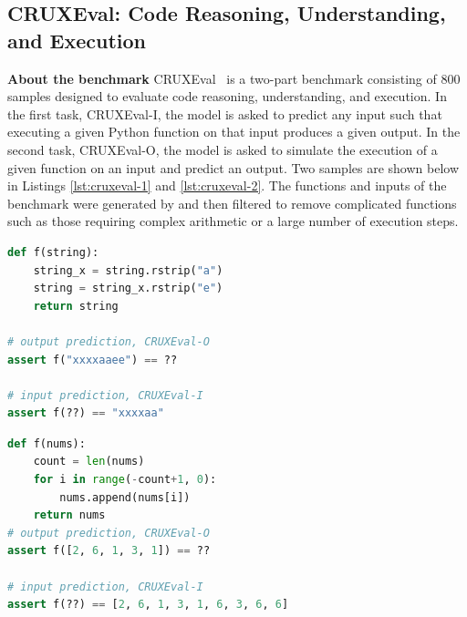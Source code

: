 \documentclass[10pt]{article} %
\begin{document}
\subsection{CRUXEval: Code Reasoning, Understanding, and Execution}
\label{crux-eval}
\textbf{About the benchmark} CRUXEval~\citep{gu2024cruxeval} is a two-part benchmark consisting of $800$ samples designed to evaluate code reasoning, understanding, and execution. In the first task, CRUXEval-I, the model is asked to predict any input such that executing a given Python function on that input produces a given output. In the second task, CRUXEval-O, the model is asked to simulate the execution of a given function on an input and predict an output. Two samples are shown below in Listings \ref{lst:cruxeval-1} and \ref{lst:cruxeval-2}. The functions and inputs of the benchmark were generated by  and then filtered to remove complicated functions such as those requiring complex arithmetic or a large number of execution steps. 

\begin{minipage}{.48\textwidth}
\begin{lstlisting}[style=cruxeval,caption={Sample CRUXEval Problem 1},label={lst:cruxeval-1}, captionpos=t, breaklines=true, language=Python]
def f(string):
    string_x = string.rstrip("a")
    string = string_x.rstrip("e")
    return string

# output prediction, CRUXEval-O
assert f("xxxxaaee") == ??

# input prediction, CRUXEval-I
assert f(??) == "xxxxaa"
\end{lstlisting}
\end{minipage}\hfill
\begin{minipage}{.48\textwidth}
\begin{lstlisting}[style=cruxeval,caption={Sample CRUXEval Problem 2},label={lst:cruxeval-2}, captionpos=t, breaklines=true, language=python]
def f(nums):
    count = len(nums)
    for i in range(-count+1, 0):
        nums.append(nums[i])
    return nums
# output prediction, CRUXEval-O
assert f([2, 6, 1, 3, 1]) == ??

# input prediction, CRUXEval-I
assert f(??) == [2, 6, 1, 3, 1, 6, 3, 6, 6]
\end{lstlisting}
\end{minipage}
\end{document}
